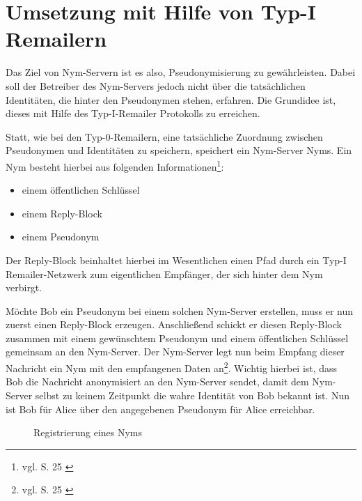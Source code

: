 \section{Umsetzung mit Hilfe von Typ-I Remailern}
Das Ziel von Nym-Servern ist es also, Pseudonymisierung zu gewährleisten. Dabei soll der Betreiber des Nym-Servers jedoch nicht über die tatsächlichen Identitäten, die hinter den Pseudonymen stehen, erfahren. Die Grundidee ist, dieses mit Hilfe des Typ-I-Remailer Protokolls zu erreichen.

Statt, wie bei den Typ-0-Remailern, eine tatsächliche Zuordnung zwischen Pseudonymen und Identitäten zu speichern, speichert ein Nym-Server Nyms.
Ein Nym besteht hierbei aus folgenden Informationen\footnote{vgl. S. 25 \cite{loesing2009privacy}}:
\begin{itemize}
\item einem öffentlichen Schlüssel
\item einem Reply-Block
\item einem Pseudonym
\end{itemize}

Der Reply-Block beinhaltet hierbei im Wesentlichen einen Pfad durch ein Typ-I Remailer-Netzwerk zum eigentlichen Empfänger, der sich hinter dem Nym verbirgt.

Möchte Bob ein Pseudonym bei einem solchen Nym-Server erstellen, muss er nun zuerst einen Reply-Block erzeugen. Anschließend schickt er diesen Reply-Block zusammen mit einem gewünschtem Pseudonym und einem öffentlichen Schlüssel gemeinsam an den Nym-Server. Der Nym-Server legt nun beim Empfang dieser Nachricht ein Nym mit den empfangenen Daten an\footnote{vgl. S. 25 \cite{loesing2009privacy}}. Wichtig hierbei ist, dass Bob die Nachricht anonymisiert an den Nym-Server sendet, damit dem Nym-Server selbst zu keinem Zeitpunkt die wahre Identität von Bob bekannt ist. Nun ist Bob für Alice über den angegebenen Pseudonym für Alice erreichbar.

\begin{figure}
	\centering
	\begin{sequencediagram}
	\end{sequencediagram}
	\caption{Registrierung eines Nyms}
\end{figure}

